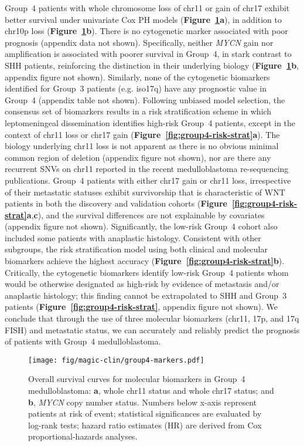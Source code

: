 \documentclass[11pt,letterpaper]{article}
\theoremstyle{definition}
\newcommand{\emphlab}[1]{\textbf{\textsf{#1}}}
\newcommand{\citefig}[1]{\emphlab{Figure~\ref{fig:#1}}}
\begin{document}
Group~4 patients with whole chromosome loss of chr11 or gain of chr17 exhibit better survival under univariate Cox PH models (\citefig{group4-markers}\emphlab{a}), in addition to chr10p loss (\citefig{group4-markers}\emphlab{b}). There is no cytogenetic marker associated with poor prognosis (appendix data not shown). Specifically, neither \emph{MYCN} gain nor amplification is associated with poorer survival in Group~4, in stark contrast to SHH patients, reinforcing the distinction in their underlying biology (\citefig{group4-markers}\emphlab{b}, appendix figure not shown). Similarly, none of the cytogenetic biomarkers identified for Group~3 patients (e.g. iso17q) have any prognostic value in Group~4 (appendix table not shown). Following unbiased model selection, the consensus set of biomarkers results in a risk stratification scheme in which leptomeningeal dissemination identifies high-risk Group~4 patients, except in the context of chr11 loss or chr17 gain (\citefig{group4-risk-strat}\emphlab{a}). The biology underlying chr11 loss is not apparent as there is no obvious minimal common region of deletion (appendix figure not shown), nor are there any recurrent SNVs on chr11 reported in the recent medulloblastoma re-sequencing publications. Group~4 patients with either chr17 gain or chr11 loss, irrespective of their metastatic statuses exhibit survivorship that is characteristic of WNT patients in both the discovery and validation cohorts (\citefig{group4-risk-strat}\emphlab{a},\emphlab{c}), and the survival differences are not explainable by covariates (appendix figure not shown). Significantly, the low-risk Group~4 cohort also included some patients with anaplastic histology. Consistent with other subgroups, the risk stratification model using both clinical and molecular biomarkers achieve the highest accuracy (\citefig{group4-risk-strat}\emphlab{b}). Critically, the cytogenetic biomarkers identify low-risk Group~4 patients whom would be otherwise designated as high-risk by evidence of metastasis and/or anaplastic histology; this finding cannot be extrapolated to SHH and Group~3 patients (\citefig{group4-risk-strat}, appendix figure not shown).  We conclude that through the use of three molecular biomarkers (chr11, 17p, and 17q FISH) and metastatic status, we can accurately and reliably predict the prognosis of patients with Group~4 medulloblastoma.

\begin{figure}[h]
	\begin{center}
		\texttt{[image: fig/magic-clin/group4-markers.pdf]}
	\end{center}
	\caption[Overall survival curves for molecular biomarkers in Group~4 medulloblastoma]
	{
	Overall survival curves for molecular biomarkers in Group~4 medulloblastoma:
	\textbf{a}, whole chr11 status and whole chr17 status; and
	\textbf{b}, \emph{MYCN} copy number status.
	Numbers below x-axis represent patients at risk of event; statistical significances are evaluated by log-rank tests; hazard ratio estimates (HR) are derived from Cox proportional-hazards analyses.
	}
	\label{fig:group4-markers}
\end{figure}
\end{document}
